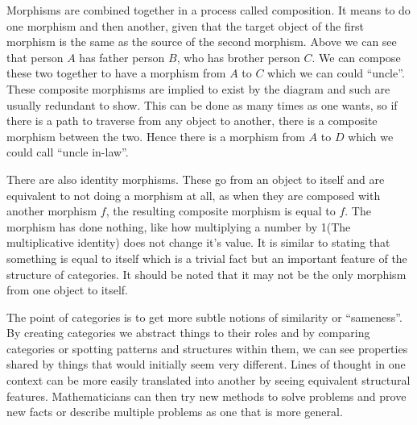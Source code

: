 \documentclass[10pt,a4paper,reqno]{amsart}
\numberwithin{figure}{section}
\begin{document}
Morphisms are combined together in a process called composition.  It means to do
one morphism and then another, given that the target object of the first
morphism is the same as the source of the second morphism.  Above we can see
that person $A$ has father person $B$, who has brother person $C$.  We can
compose these two together to have a morphism from $A$ to $C$ which we can could
``uncle''.  These composite morphisms are implied to exist by the diagram and
such are usually redundant to show.  This can be done as many times as one
wants, so if there is a path to traverse from any object to another, there is a
composite morphism between the two.  Hence there is a morphism from $A$ to $D$
which we could call ``uncle in-law''.

There are also identity morphisms.  These go from an object to itself and are
equivalent to not doing a morphism at all, as when they are composed with
another morphism $f$, the resulting composite morphism is equal to $f$.  The
morphism has done nothing, like how multiplying a number by 1(The multiplicative
identity) does not change it's value.  It is similar to stating that something
is equal to itself which is a trivial fact but an important feature of the
structure of categories.  It should be noted that it may not be the only
morphism from one object to itself.

The point of categories is to get more subtle notions of similarity or
``sameness''.
By creating categories we abstract things to their roles and by comparing
categories or spotting patterns and structures within them, we can see
properties shared by things that would initially seem very different.  Lines of
thought in one context can be more easily translated into another by seeing
equivalent structural features.  Mathematicians can then try new methods to
solve problems and prove new facts or describe multiple problems as one that is
more general.
\end{document}
